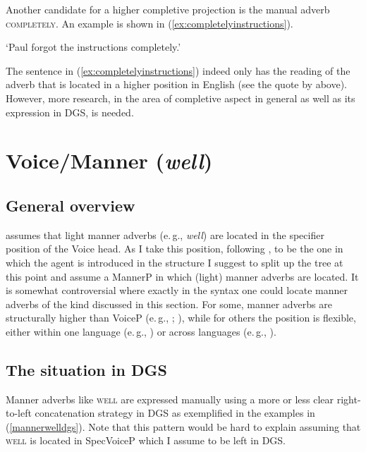 Another candidate for a higher completive projection is the manual adverb \textsc{completely}. An example is shown in (\ref{ex:completelyinstructions}). 

\begin{exe}
\glt `Paul forgot the instructions completely.' \label{ex:completelyinstructions}
\end{exe} 

\noindent The sentence in (\ref{ex:completelyinstructions}) indeed only has the reading of the adverb that is located in a higher position in English (see the quote by \citealt[178]{cinque1999adverbs} above). However, more research, in the area of completive aspect in general as well as its expression in DGS, is needed.





\section{Voice/Manner (\textit{well})}

\subsection{General overview}
\citet[101--102]{cinque1999adverbs} assumes that light manner adverbs (e.\,g., \textit{well}) are located in the specifier position of the Voice head. As I take this position, following \citet{kratzer1996severing}, to be the one in which the agent is introduced in the structure I suggest to split up the tree at this point and assume a MannerP in which (light) manner adverbs are located. It is somewhat controversial where exactly in the syntax one could locate manner adverbs of the kind discussed in this section. For some, manner adverbs are structurally higher than VoiceP (e.\,g., \citealt{alexeyenko2012manner}; \citealt{cognola2013mixed}), while for others the position is flexible, either within one language (e.\,g., \citealt{haumann2007adverb}) or across languages (e.\,g., \citealt{kahnemuyipour2009syntax}). 

\subsection{The situation in DGS}
Manner adverbs like \textsc{well} are expressed manually using a more or less clear right-to-left concatenation strategy in DGS as exemplified in the examples in (\ref{mannerwelldgs}). Note that this pattern would be hard to explain assuming that \textsc{well} is located in SpecVoiceP which I assume to be left in DGS.

